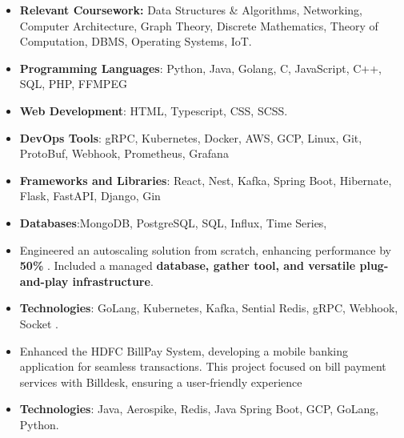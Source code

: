 



\smallskip
\begin{itemize}
    \item \textbf{Relevant Coursework:} Data Structures \& Algorithms, Networking, Computer Architecture, Graph Theory, Discrete Mathematics, Theory of Computation, DBMS, Operating Systems, IoT.
\end{itemize}




\smallskip
\begin{itemize}
\item \textbf{Programming Languages}: Python, Java, Golang, C, JavaScript, C++, SQL, PHP, FFMPEG
\smallskip
\item \textbf{Web Development}: HTML, Typescript, CSS, SCSS.
\smallskip
\item \textbf{DevOps Tools}: gRPC, Kubernetes, Docker, AWS, GCP, Linux, Git, ProtoBuf, Webhook, Prometheus, Grafana 
\smallskip
\item \textbf{Frameworks and Libraries}: React, Nest, Kafka, Spring Boot, Hibernate, Flask, FastAPI, Django, Gin
\smallskip
\item \textbf{Databases}:MongoDB, PostgreSQL, SQL, Influx, Time Series,  
\smallskip
\end{itemize}


  
\begin{itemize}
\item Engineered an autoscaling solution from scratch, enhancing performance by \textbf{ 50\% }. Included a managed \textbf{database, gather tool, and versatile plug-and-play infrastructure}.
\item \textbf{Technologies}: GoLang, Kubernetes, Kafka, Sential Redis, gRPC, Webhook, Socket .\\
\end{itemize}
\smallskip
\smallskip

\begin{itemize}
\item Enhanced the HDFC BillPay System, developing a mobile banking application for seamless transactions. This project focused on bill payment services with Billdesk, ensuring a user-friendly experience
\item \textbf{Technologies}: Java, Aerospike, Redis, Java Spring Boot, GCP, GoLang, Python.\\
\end{itemize}
\smallskip
\smallskip

